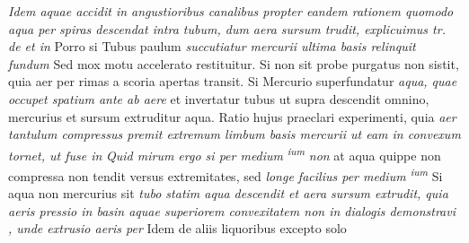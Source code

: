 \textit{Idem aquae accidit in angustioribus canalibus propter eandem rationem quomodo aqua per spiras descendat intra tubum, dum aera sursum trudit, explicuimus tr. de  et in } Porro si Tubus paulum \textit{succutiatur mercurii ultima basis relinquit fundum  \hspace{-1.2mm}}
Sed mox motu accelerato restituitur. Si non sit probe purgatus non sistit, quia aer per rimas a scoria apertas transit. Si Mercurio\protect{} superfundatur \textit{aqua, quae occupet spatium ante ab aere } et invertatur tubus ut supra descendit omnino, mercurius et sursum extruditur aqua. Ratio hujus praeclari experimenti, quia \textit{aer tantulum compressus premit extremum limbum basis mercurii ut eam in convexum tornet, ut fuse in
}
\textit{Quid mirum ergo si per medium}
\mercury\textsuperscript{\textit{ium}}\textit{ non
} at aqua quippe non compressa non tendit versus extremitates, sed \textit{longe facilius per medium \mercury\textsuperscript{\textit{ium}}
} Si aqua non mercurius sit 
 \textit{tubo statim aqua descendit et aera sursum extrudit, quia aeris pressio in basin aquae superiorem convexitatem non 
 in dialogis demonstravi 
, unde extrusio aeris per } Idem de aliis liquoribus excepto solo 
